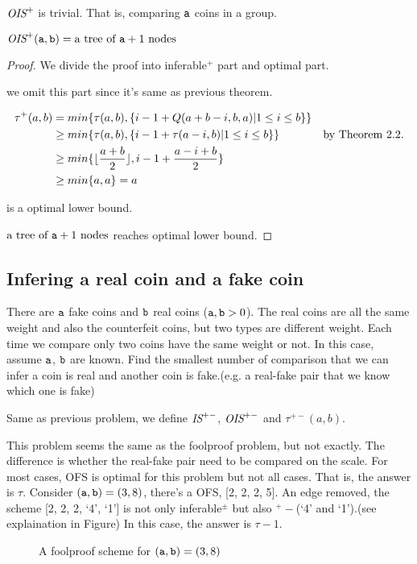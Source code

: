 $\text{\it OIS}^+$ is trivial.
That is, comparing $\mathtt{a}$ coins in a group. 

\begin{theorem}
$\text{\it OIS}^+(\mathtt{a},\mathtt{b})=\text{a tree of }\mathtt{a}+1\text{ nodes}$
\end{theorem}
\begin{proof}
We divide the proof into inferable$^+$ part and optimal part.


we omit this part since it's same as previous theorem.

\begin{align*}
\tau^+(a,b)&=min\{\tau(a,b), \{i-1+Q(a+b-i,b,a) | 1\leq i\leq b\} \}&\\
&\geq min\{\tau(a,b), \{i-1+\tau(a-i,b) | 1\leq i\leq b\} \} &\text{by Theorem 2.2.}\\
&\geq min\{\lfloor\frac{a+b}{2}\rfloor, i-1+\frac{a-i+b}{2}\}&\\
&\geq min\{a, a\}=a &
\end{align*}

is a optimal lower bound.

$\text{a tree of }\mathtt{a}+1\text{ nodes}$ reaches optimal lower bound.
\end{proof}

\subsection*{Infering a real coin and a fake coin}

{
\setlength{\leftskip}{1cm}
\setlength{\rightskip}{1cm}
\noindent 
There are $\mathtt{a}$ fake coins and $\mathtt{b}$ real coins ($\mathtt{a}, \mathtt{b} > 0$). The real coins are all the same weight and also the counterfeit coins, but two  types are different weight. Each time we compare only two coins have the same weight or not. In this case, assume $\mathtt{a}$, $\mathtt{b}$ are known.
Find the smallest number of comparison that we can infer a coin is real and another coin is fake.(e.g. a real-fake pair that we know which one is fake)\\

}
\begin{definition}
Same as previous problem, we define $\text{\it IS}^{+-}$, $\text{\it OIS}^{+-}$ and $\tau^{+-}(a,b)$.
\end{definition}

This problem seems the same as the foolproof problem, but not exactly. The difference is whether the real-fake pair need to be compared on the scale. For most cases, OFS is optimal for this problem but not all cases. That is, the answer is $\tau$. Consider $(\mathtt{a},\mathtt{b})=(3,8)$, there's a OFS, [2, 2, 2, 5]. An edge removed, the scheme [2, 2, 2, `4', `1'] is not only inferable$^\pm$ but also $^+-$(`4' and `1').(see explaination in Figure) In this case, the answer is $\tau-1$.
\begin{figure}[!htb]
   \centering
     \vspace*{2.5ex}
    \caption{A foolproof scheme for $(\mathtt{a},\mathtt{b})=(3,8)$}
\end{figure}

